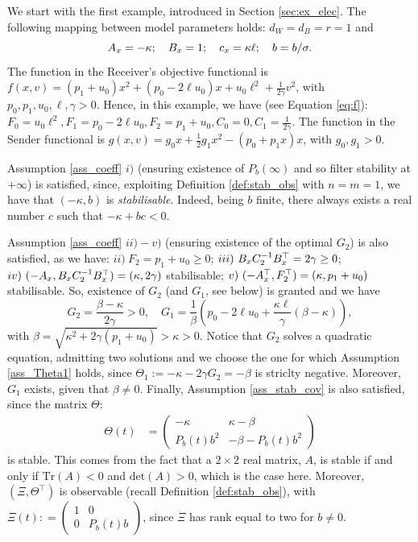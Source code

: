 \documentclass[a4paper,10pt]{article}
\theoremstyle{definition}
\theoremstyle{plain}
\numberwithin{equation}{section}
\begin{document}
We start with the first example, introduced in Section \ref{sec:ex_elec}. The following mapping between model parameters holds: $d_W = d_B = r=1$ and
$$
A_{\rm x} = - \kappa; \quad  B_{\rm x}  = 1 ; \quad  c_{\rm x} =  \kappa \ell; \quad b= b/\sigma.
$$
The function in the Receiver's objective functional is $f(x,v) =  (p_1 + u_0) x^2 + ( p_0 - 2 \ell u_0) x+ u_0 \ell^2 + \frac{1}{2\gamma} v^2$, with $p_0, p_1, u_0, \ell,\gamma >0$. Hence, in this example, we have  (see Equation \eqref{eq:f}): $F_0 = u_0 \ell^2, F_1 = p_0 - 2 \ell u_0, F_2 = p_1 + u_0, C_0=0, C_1= \frac{1}{2 \gamma}$. 
The function in the Sender functional is $g(x,v) = g_0 x + \frac12 g_1 x^2 - (p_0 + p_1 x) x$, with $g_0, g_1 >0$.

Assumption \ref{ass_coeff} $i)$ (ensuring existence of $P_b(\infty)$ and so filter stability at $+\infty$) is satisfied, since, exploiting Definition \ref{def:stab_obs} with $n=m=1$, we have that $(- \kappa, b)$ is \emph{stabilisable}. Indeed, being $b$ finite, there always exists a real number $c$ such that $-\kappa + b c <0$.

Assumption \ref{ass_coeff} $ii) - v)$ (ensuring existence of the optimal $G_2$) is also satisfied, as we have: $ii) \ F_2 = p_1 + u_0 \ge 0$; $iii) \ B_{\rm x} C_2^{-1} B_{\rm x}^\top = 2 \gamma \ge 0$;
$iv)\  (-A_{\rm x}, B_{\rm x} C_2^{-1} B_{\rm x}^\top) = (\kappa, 2 \gamma)$ stabilisable; $v) \  (-A_{\rm x}^\top,F_2^\top) = (\kappa, p_1 + u_0) $ stabilisable.
So, existence of $G_2$ (and $G_1$, see below) is granted and we have
$$
G_2 = \frac{\beta - \kappa}{2 \gamma} >0, \quad G_1 = \frac{1}{\beta} \left( p_0 - 2 \ell u_0 + \frac{\kappa \ell}{\gamma} (\beta - \kappa) \right),
$$
with $\beta = \sqrt{\kappa^2 + 2 \gamma (p_1 + u_0)} > \kappa >0$. Notice that $G_2$ solves a quadratic equation, admitting two solutions and we choose the one for which  Assumption \ref{ass_Theta1} holds,  since $\Theta_1 := - \kappa - 2 \gamma G_2 = - \beta $ is striclty negative.
Moreover, $G_1$ exists, given that $\beta \neq 0$.
Finally, Assumption \ref{ass_stab_cov} is also satisfied, since the matrix $\Theta$:
\begin{align*}  \Theta(t) & =
\begin{pmatrix}
        -\kappa  & \kappa - \beta\\
        P_b(t) b^2 & -\beta -  P_b(t)b^2
    \end{pmatrix}
    \end{align*} 
is stable. This comes from the fact that a $2\times2$ real matrix, $A$, is stable if and only if $\textrm{Tr}(A) <0$ and $\textrm{det}(A)>0$, which is the case here. Moreover, $(\Xi, \Theta^\top )$ is observable (recall Definition \ref{def:stab_obs}), with $\Xi(t) : =
    \begin{pmatrix}
        1 &  0\\
         0 & P_b(t)b 
    \end{pmatrix}$, since $\Xi$ has rank equal to two for $b \neq 0$.
\end{document}
